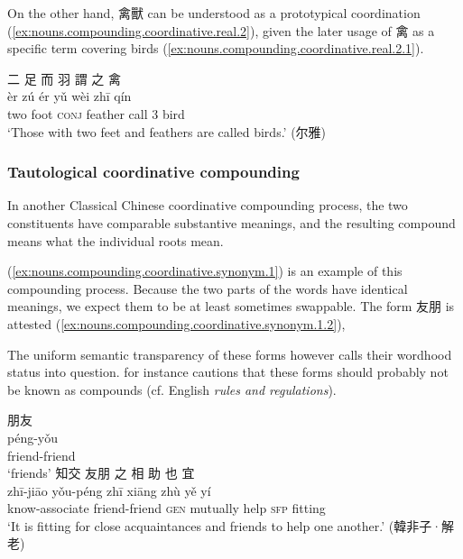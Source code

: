 \documentclass[UTF8, a4paper, oneside, scheme=plain, 12pt]{ctexrep}
\newcommand*{\citepage}[1]{p.~{#1}}
\newcommand{\form}[1]{\emph{#1}}
\newcommand{\translate}[1]{`#1'}
\newcommand*{\category}[1]{\textsc{#1}}
\begin{document}
On the other hand, 禽獸 can be understood as a prototypical coordination (\ref{ex:nouns.compounding.coordinative.real.2}),
given the later usage of 禽 as a specific term covering birds (\ref{ex:nouns.compounding.coordinative.real.2.1}).

\begin{exe}
    \ex\label{ex:nouns.compounding.coordinative.real.2.1}
    \glll 二 足 而 羽 謂 之 禽 \\
    èr zú ér yǔ wèi zhī qín \\
    two foot \category{conj} feather call 3 bird \\
    \glt\translate{Those with two feet and feathers are called birds.} \hfill (尔雅)
\end{exe}

\subsubsection{Tautological coordinative compounding}

In another Classical Chinese coordinative compounding process, 
the two constituents have comparable substantive meanings,
and the resulting compound means what the individual roots mean.

(\ref{ex:nouns.compounding.coordinative.synonym.1}) is an example of this compounding process.
Because the two parts of the words have identical meanings, 
we expect them to be at least sometimes swappable.
The form 友朋 is attested (\ref{ex:nouns.compounding.coordinative.synonym.1.2}),

The uniform semantic transparency of these forms however calls their wordhood status into question.
\citet[\citepage{11}]{unger2019grammar} for instance cautions that 
these forms should probably not be known as compounds (cf. English \form{rules and regulations}).

\begin{exe}
    \ex\label{ex:nouns.compounding.coordinative.synonym.1}
    \glll 朋友 \\
    péng-yǒu \\
    friend-friend \\
    \glt\translate{friends}
    \ex\label{ex:nouns.compounding.coordinative.synonym.1.2}
    \glll 知交 友朋 之 相 助 也 宜 \\
    zhī-jiāo yǒu-péng zhī xiāng zhù yě yí \\
    know-associate friend-friend \category{gen} mutually help \category{sfp} fitting \\
    \glt\translate{It is fitting for close acquaintances and friends to help one another.} \hfill (韓非子·解老)
\end{exe}
\end{document}
